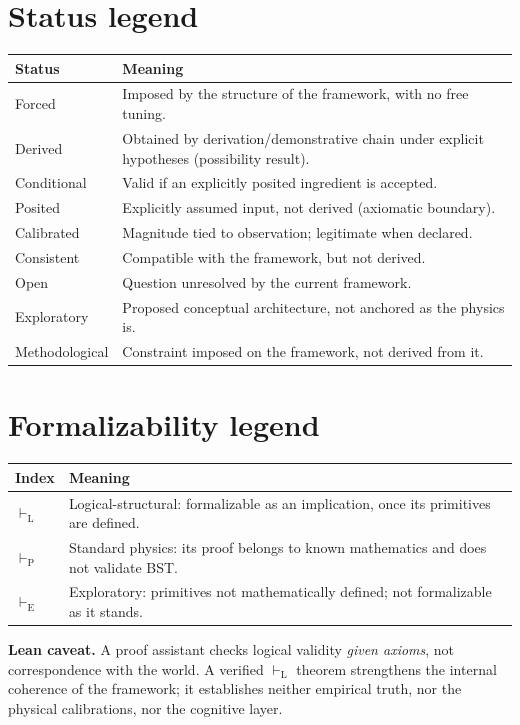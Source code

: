 \documentclass[11pt]{book}
\begin{document}
\section{Status legend}
\begin{center}
\begin{tabular}{ll}
\hline
Status & Meaning \\
\hline
Forced & Imposed by the structure of the framework, with no free tuning. \\
Derived & Obtained by derivation/demonstrative chain under explicit hypotheses (possibility result). \\
Conditional & Valid if an explicitly posited ingredient is accepted. \\
Posited & Explicitly assumed input, not derived (axiomatic boundary). \\
Calibrated & Magnitude tied to observation; legitimate when declared. \\
Consistent & Compatible with the framework, but not derived. \\
Open & Question unresolved by the current framework. \\
Exploratory & Proposed conceptual architecture, not anchored as the physics is. \\
Methodological & Constraint imposed on the framework, not derived from it. \\
\hline
\end{tabular}
\end{center}

\section{Formalizability legend}
\begin{center}
\begin{tabular}{ll}
\hline
Index & Meaning \\
\hline
$\vdash_{\mathrm{L}}$ & Logical-structural: formalizable as an implication, once its primitives are defined. \\
$\vdash_{\mathrm{P}}$ & Standard physics: its proof belongs to known mathematics and does not validate BST. \\
$\vdash_{\mathrm{E}}$ & Exploratory: primitives not mathematically defined; not formalizable as it stands. \\
\hline
\end{tabular}
\end{center}
\noindent\textbf{Lean caveat.} A proof assistant checks logical validity \emph{given axioms}, not correspondence with the world. A verified $\vdash_{\mathrm{L}}$ theorem strengthens the internal coherence of the framework; it establishes neither empirical truth, nor the physical calibrations, nor the cognitive layer.
\end{document}
